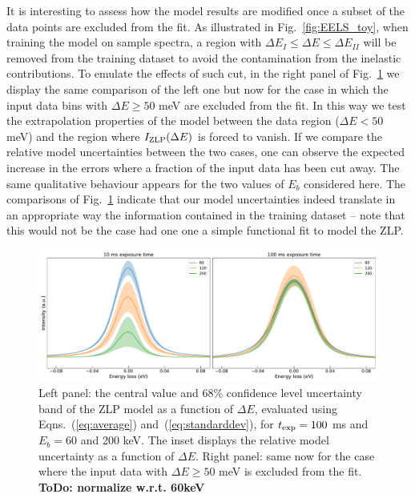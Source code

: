 It is interesting to assess how the model results are modified once a subset of the data points
are excluded from the fit.
%
As illustrated in Fig.~\ref{fig:EELS_toy}, when training the model on sample spectra, a region
with $\Delta E_I \le \Delta E \le \Delta E_{II}$ will be removed from the training dataset to avoid the
contamination from the inelastic contributions.
%
To emulate the effects of such cut, in the right panel of Fig.~\ref{fig:EELS_vacuum_DeltaE} we
display the same comparison of the left one but now
for the case in which the input data bins with $\Delta E \ge 50$ meV are excluded from the fit.
%
In this way we test the extrapolation properties of the model between the data region ($\Delta E < 50$ meV)
and the region where $I_{\rm ZLP}(\Delta E)$ is forced to vanish.
%
If we compare the relative model uncertainties between the two cases, one can observe the expected
increase in the errors where a fraction of the input data has been cut away.
%
The same qualitative behaviour appears for the two values of $E_b$ considered here.
%
The comparisons of Fig.~\ref{fig:EELS_vacuum_DeltaE} indicate that our model uncertainties
indeed translate in an appropriate way the information contained in the training dataset -- note that
this would not be the case had one one a simple functional fit to model the ZLP.

\begin{figure}[h]
    \centering
    \includegraphics[width=120mm]{plots/120keV.pdf}
    \caption{Left panel: the central value and 68\% confidence level uncertainty band of the ZLP model as a function
      of $\Delta E$,
      evaluated using Eqns.~(\ref{eq:average}) and~(\ref{eq:standarddev}), for $t_{\rm exp}=100$ ms
      and $E_{b}=60$ and 200 keV.
      The inset displays the relative model uncertainty as a function of $\Delta E$.
      Right panel: same now for the case where the input data with $\Delta E \ge 50$ meV is excluded from the fit.
      {\bf  ToDo: normalize w.r.t. 60keV}}
    \label{fig:EELS_vacuum_DeltaE}
\end{figure}

